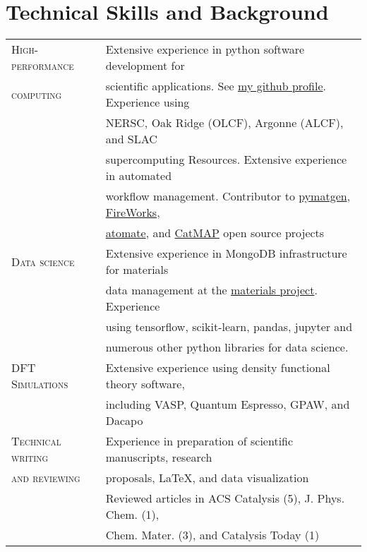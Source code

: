 \documentclass[a4paper,10pt]{article}
\begin{document}
\section{Technical Skills and Background}
\begin{tabular}{ll}
 \textsc{High-performance} & Extensive experience in python software development for \\ 
 \textsc{computing}  & scientific applications.  See \href{https://github.com/montoyjh}{my github profile}. Experience using\\
 & NERSC, Oak Ridge (OLCF), Argonne (ALCF), and SLAC \\
 &supercomputing Resources.  Extensive experience in automated \\
 &workflow management. Contributor to \href{pymatgen.org}{pymatgen}, \href{https://materialsproject.github.io/fireworks/}{FireWorks},\\
 &\href{https://hackingmaterials.github.io/atomate}{atomate}, and \href{http://catmap.readthedocs.io/en/latest/}{CatMAP} open source projects\vspace{0.1in}\\
 \textsc{Data science} & Extensive experience in MongoDB infrastructure for materials \\
 & data management at the \href{http://materialsproject.org}{materials project}.  Experience \\
 & using tensorflow, scikit-learn, pandas, jupyter and \\
 & numerous other python libraries for data science.\vspace{0.1in}\\
 \textsc{DFT Simulations} & Extensive experience using density functional theory software, \\
 & including VASP, Quantum Espresso, GPAW, and Dacapo \vspace{0.1in}\\
 \textsc{Technical writing} & Experience in preparation of scientific manuscripts, research \\
 \textsc{and reviewing} & proposals, \LaTeX, and data visualization \vspace{0.05in}\\
& Reviewed articles in ACS Catalysis (5), J. Phys. Chem. (1), \\
& Chem. Mater. (3), and Catalysis Today (1)
 \end{tabular}
\end{document}

